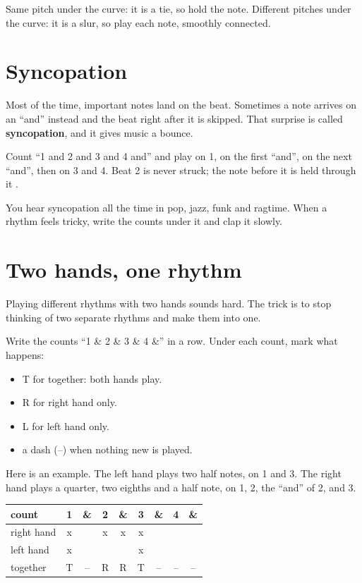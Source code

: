 \begin{recoverybox}
Same pitch under the curve: it is a tie, so hold the note. Different pitches under the curve: it is a slur, so play each note, smoothly connected.
\end{recoverybox}

\section{Syncopation}

Most of the time, important notes land on the beat. Sometimes a note arrives on an ``and'' instead and the beat right after it is skipped. That surprise is called \textbf{syncopation}, and it gives music a bounce.

Count ``1 and 2 and 3 and 4 and'' and play on 1, on the first ``and'', on the next ``and'', then on 3 and 4. Beat 2 is never struck; the note before it is held through it .

You hear syncopation all the time in pop, jazz, funk and ragtime. When a rhythm feels tricky, write the counts under it and clap it slowly.

\section{Two hands, one rhythm}

Playing different rhythms with two hands sounds hard. The trick is to stop thinking of two separate rhythms and make them into one.

Write the counts ``1 \& 2 \& 3 \& 4 \&'' in a row. Under each count, mark what happens:
\begin{itemize}
  \item T for together: both hands play.
  \item R for right hand only.
  \item L for left hand only.
  \item a dash (--) when nothing new is played.
\end{itemize}

Here is an example. The left hand plays two half notes, on 1 and 3. The right hand plays a quarter, two eighths and a half note, on 1, 2, the ``and'' of 2, and 3.

\begin{center}
\begin{tabular}{lcccccccc}
\toprule
count & 1 & \& & 2 & \& & 3 & \& & 4 & \& \\
\midrule
right hand & x & & x & x & x & & & \\
left hand & x & & & & x & & & \\
\midrule
together & T & -- & R & R & T & -- & -- & -- \\
\bottomrule
\end{tabular}
\end{center}

